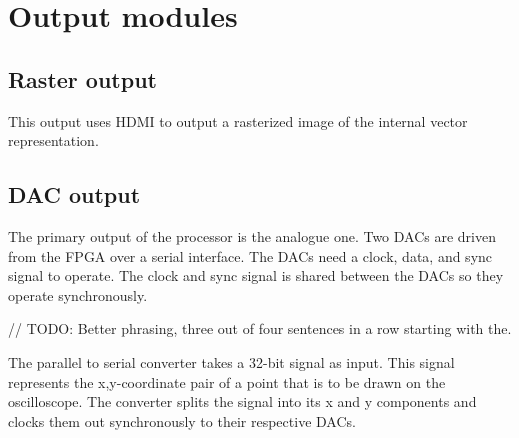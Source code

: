 \chapter{Output modules}
\label{chap:Output}

\section{Raster output}

This output uses HDMI to output a rasterized image of the internal vector representation.

\section{DAC output}

The primary output of the processor is the analogue one.
Two DACs are driven from the FPGA over a serial interface.
The DACs need a clock, data, and sync signal to operate. 
The clock and sync signal is shared between the DACs so they operate synchronously. 

// TODO: Better phrasing, three out of four sentences in a row starting with the.

The parallel to serial converter takes a 32-bit signal as input.
This signal represents the x,y-coordinate pair of a point that is to be drawn on the oscilloscope.
The converter splits the signal into its x and y components and clocks them out synchronously to their respective DACs.
